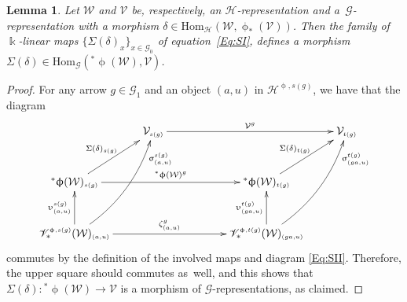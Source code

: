 \documentclass[11pt]{article}
\numberwithin{equation}{section}
\newtheorem{Lemma}[Theorem]{Lemma}
\renewcommand{\hom}[3]{\mathrm{Hom}_{\Sscript{#1}}\left(#2, #3\right)}
\newcommand{\Go}{\cG_{\Sscript{0}}}
\newcommand{\Ga}{\cG_{\Sscript{1}}}
\newcommand{\Vg}{\cV^{\Sscript{g}}}
\newcommand{\vV}{\mathscr{V}}
\newcommand{\cG}{{\mathcal G}}
\newcommand{\cH}{{\mathcal H}}
\newcommand{\cV}{{\mathcal V}}
\newcommand{\cW}{{\mathcal W}}
\newcommand{\Sscript}[1]{\scriptscriptstyle{#1}}
\begin{document}
\begin{Lemma}\label{lema:Sigma}Let $\cW$ and $\cV$ be, respectively, an $\cH$-representation and a~$\cG$-representation with a morphism $\delta \in \hom{\cH}{\cW}{\upphi_{*}(\cV)}$. Then the family of $\Bbbk$-linear
maps $\big\{ \Sigma(\delta)_{\Sscript{x}} \big\}_{\Sscript{ x \in \Go}}$ of equation~\eqref{Eq:SI}, defines a morphism $\Sigma(\delta) \in \hom{\cG}{{}^*\upphi(\cW)}{\cV}$.
\end{Lemma}
\begin{proof}For any arrow $g \in \Ga$ and an object $(a,u)$ in $\cH^{\Sscript{\upphi, s(g)}}$, we have that the diagram
\begin{gather*}
\xymatrix@R=30pt{ & \cV_{\Sscript{s(g)}} \ar@{->}^-{\Vg}[rrr] & & &
\cV_{\Sscript{t(g)}} \\ {}^*\upphi(\cW)_{\Sscript{s(g)}}
\ar@{->}^-{{}^*\upphi(\cW)^g}[rrr]
\ar@{->}^-{\Sigma(\delta)_{\Sscript{s(g)}}}[ur] & & &
{}^*\upphi(\cW)_{\Sscript{t(g)}}
\ar@{->}^-{\Sigma(\delta)_{\Sscript{t(g)}}}[ur] & \\
\vV^{\Sscript{\upphi, s(g)}}_*(\cW)_{\Sscript{(a, u)}}
\ar@{->}@/_1pc /_->>>>{\upsigma^{\Sscript{s(g)}}_{\Sscript{(a,
u)}}}[uur] \ar@{->}^-{\zeta^g_{(a, u)}}[rrr]
\ar@{->}^-{\upupsilon^{\Sscript{s(g)}}_{\Sscript{(a, u)}}}[u] & &
& \ar@{->}^-{\upupsilon^{\Sscript{t(g)}}_{\Sscript{(ga, u)}}}[u]
\ar@{->}@/_1pc /_->>>>{\upsigma^{\Sscript{t(g)}}_{\Sscript{(ga,
u)}}}[uur] \vV^{\Sscript{\upphi, t(g)}}_*(\cW)_{\Sscript{(ga,
u)}} & }
\end{gather*}
commutes by the definition of the involved maps and diagram \eqref{Eq:SII}. Therefore, the upper square should commutes as~well, and this shows that $\Sigma(\delta)\colon {}^*\upphi(\cW) \to \cV $ is a morphism of $\cG$-representations, as claimed.
\end{proof}
\end{document}
